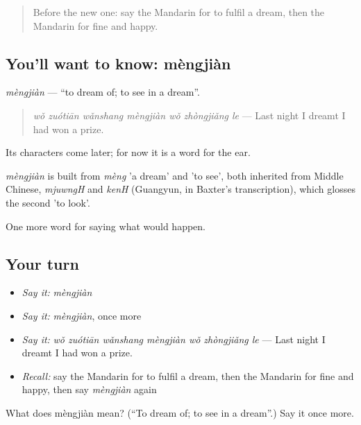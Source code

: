 \label{lesson:ZH-C536-mengjian}



\begin{quote}
Before the new one: say the Mandarin for to fulfil a dream, then the Mandarin for fine and happy.
\end{quote}

\subsection*{You'll want to know: mèngjiàn}
\emph{mèngjiàn} — \textquotedblleft{}to dream of; to see in a dream\textquotedblright{}.

\begin{quote}
\emph{wǒ zuótiān wǎnshang mèngjiàn wǒ zhòngjiǎng le} — Last night I dreamt I had won a prize.
\end{quote}

Its characters come later; for now it is a word for the ear.

\begin{cousinweb}
\emph{mèngjiàn} is built from \emph{mèng} 'a dream' and  'to see', both inherited from Middle Chinese, \emph{mjuwngH} and \emph{kenH} (Guangyun, in Baxter's transcription), which glosses the second 'to look'.
\end{cousinweb}

\begin{grammarlens}[title={What you've built}]
One more word for saying what would happen.
\end{grammarlens}

\subsection*{Your turn}
\begin{itemize}
\raggedright
  \item \emph{Say it:} \emph{mèngjiàn}
  \item \emph{Say it:} \emph{mèngjiàn}, once more
  \item \emph{Say it:} \emph{wǒ zuótiān wǎnshang mèngjiàn wǒ zhòngjiǎng le} — Last night I dreamt I had won a prize.
  \item \emph{Recall:} say the Mandarin for to fulfil a dream, then the Mandarin for fine and happy, then say \emph{mèngjiàn} again
\end{itemize}

\begin{tcolorbox}[breakable,colback=teal!4,colframe=teal!35!black,title={Before you move on}]
What does mèngjiàn mean? (\textquotedblleft{}To dream of; to see in a dream\textquotedblright{}.) Say it once more.
\end{tcolorbox}
